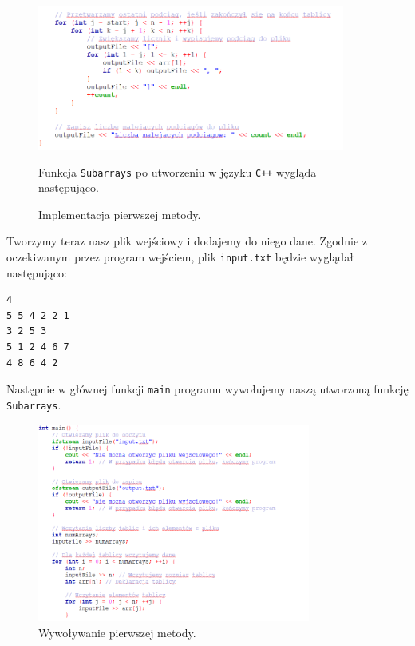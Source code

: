 \documentclass[a4paper,12pt]{article}
\begin{document}
\begin{figure}[H]
    \centering
    \includegraphics[width=0.9\textwidth]{Implement2.png}
    \caption{Implementacja pierwszej metody.}
    \label{fig:schemat_Implement2}
    \rule{0cm}{1.3cm} %
    Funkcja \texttt{Subarrays} po utworzeniu w języku \texttt{C++} wygląda następująco.
\end{figure}

\newpage

Tworzymy teraz nasz plik wejściowy i dodajemy do niego dane. Zgodnie z oczekiwanym przez program wejściem, plik \texttt{input.txt} będzie wyglądał następująco: 

\begin{verbatim}
4
5 5 4 2 2 1
3 2 5 3
5 1 2 4 6 7
4 8 6 4 2
\end{verbatim}

Następnie w głównej funkcji \texttt{main} programu wywołujemy naszą utworzoną funkcję \texttt{Subarrays}.

\begin{figure}[H]
    \centering
    \includegraphics[width=0.8\textwidth]{Implement3.png}
    \caption{Wywoływanie pierwszej metody.}
    \label{fig:schemat_Implement3}
\end{figure}
\end{document}
